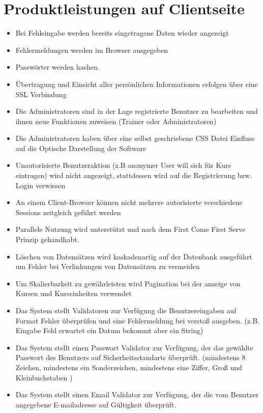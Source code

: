 \documentclass[a4paper]{scrreprt}
\begin{document}
\section{Produktleistungen auf Clientseite}
\begin{itemize}
	\item \Func{} Bei Fehleingabe werden bereits eingetragene Daten wieder angezeigt
	\item \Func{} Fehlermeldungen werden im Browser ausgegeben
	\item \Func{} Passwörter werden \gls{hashen}.
	\item \Func{} Übertragung und Einsicht aller persönlichen Informationen erfolgen über eine SSL Verbindung
	\item \Func{} Die Administratoren sind in der Lage registrierte Benutzer zu bearbeiten und ihnen neue Funktionen zuweisen (Trainer oder Administratoren)
	\item \Func{} Die Administratoren haben über eine selbst geschriebene CSS Datei Einfluss auf die Optische Darstellung der Software 
	\item \Func{} Unautorisierte Benutzeraktion (z.B anonymer User will sich für Kurs eintragen) wird nicht angezeigt, stattdessen wird auf die Registrierung bzw. Login verwiesen
	\item \Func{} An einem Client-Browser können nicht mehrere autorisierte verschiedene Sessions zeitgleich geführt werden
	\item \Func{} Parallele Nutzung wird unterstützt und nach dem First Come First Serve Prinzip gehandhabt.
	\item \Func{} Löschen von Datensätzen wird kaskadenartig auf der Datenbank ausgeführt um Fehler bei Verlinkungen von Datensätzen zu vermeiden
	\item \Func{} Um Skalierbarkeit zu gewährleisten wird Pagination bei der anzeige von Kursen und Kurseinheiten verwendet 
	\item \Func{} Das System stellt Validatoren zur Verfügung die Benutzereingaben auf Format Fehler überprüfen und eine Fehlermeldung bei verstoß ausgeben. (z.B. Eingabe Feld erwartet ein Datum bekommt aber ein String)
	\item \Func{} Das System stellt einen Passwort Validator zur Verfügung, der das gewählte Passwort des Benutzers auf Sicherheitsstandarts überprüft. (mindestens 8 Zeichen, mindestens ein Sonderzeichen, mindestens eine Ziffer, Groß und Kleinbuchstaben )
	\item \Func{} Das System stellt einen Email Validator zur Verfügung, der die vom Benutzer angegebene E-mailadresse auf Gültigkeit überprüft.

\end{itemize}
\end{document}
